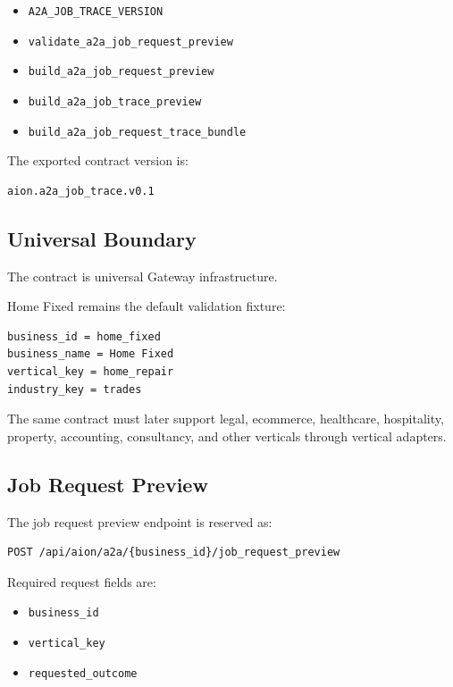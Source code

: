 \begin{itemize}
  \item \texttt{A2A\_JOB\_TRACE\_VERSION}
  \item \texttt{validate\_a2a\_job\_request\_preview}
  \item \texttt{build\_a2a\_job\_request\_preview}
  \item \texttt{build\_a2a\_job\_trace\_preview}
  \item \texttt{build\_a2a\_job\_request\_trace\_bundle}
\end{itemize}

The exported contract version is:

\begin{verbatim}
aion.a2a_job_trace.v0.1
\end{verbatim}

\subsection{Universal Boundary}

The contract is universal Gateway infrastructure.

Home Fixed remains the default validation fixture:

\begin{verbatim}
business_id = home_fixed
business_name = Home Fixed
vertical_key = home_repair
industry_key = trades
\end{verbatim}

The same contract must later support legal, ecommerce, healthcare, hospitality, property, accounting, consultancy, and other verticals through vertical adapters.

\subsection{Job Request Preview}

The job request preview endpoint is reserved as:

\begin{verbatim}
POST /api/aion/a2a/{business_id}/job_request_preview
\end{verbatim}

Required request fields are:

\begin{itemize}
  \item \texttt{business\_id}
  \item \texttt{vertical\_key}
  \item \texttt{requested\_outcome}
\end{itemize}

